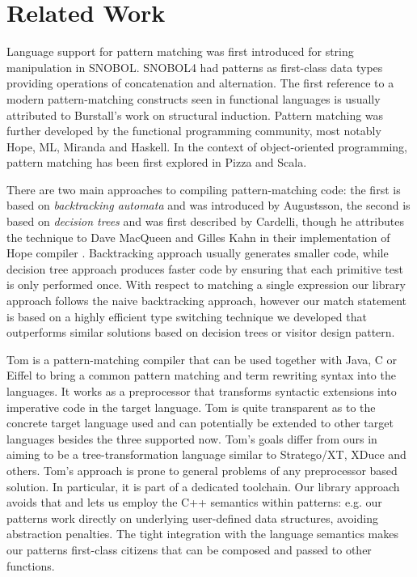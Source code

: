 \documentclass{llncs}
\begin{document}
\section{Related Work} %
\label{sec:rw}

Language support for pattern matching was first introduced for string 
manipulation in SNOBOL\cite{SNOBOL64}. SNOBOL4 had patterns as first-class data 
types providing operations of concatenation and alternation\cite{SNOBOL71}. The 
first reference to a modern pattern-matching constructs seen in functional 
languages is usually attributed to Burstall's work on structural 
induction\cite{Burstall69provingproperties}. Pattern matching was further 
developed by the functional programming community, most notably 
Hope\cite{BMS80}, ML\cite{ML90}, Miranda\cite{Miranda85} and 
Haskell\cite{Haskell98Book}. In the context of object-oriented programming, 
pattern matching has been first explored in Pizza\cite{Odersky97pizzainto} and 
Scala\cite{Scala2nd,EmirThesis}.

There are two main approaches to compiling pattern-matching code: the first is 
based on \emph{backtracking automata} and was introduced by Augustsson\cite{Augustsson85}, 
the second is based on \emph{decision trees} and was first described by 
Cardelli\cite{Cardelli84}, though he attributes the technique to Dave MacQueen 
and Gilles Kahn in their implementation of Hope compiler \cite{BMS80}.
Backtracking approach usually generates smaller code, while decision tree 
approach produces faster code by ensuring that each primitive test is only 
performed once. With respect to matching a single expression our library 
approach follows the naive backtracking approach, however our match statement is 
based on a highly efficient type switching technique we developed\cite{TypeSwitch} 
that outperforms similar solutions based on decision trees or visitor design pattern.

Tom is a pattern-matching compiler that can be used together with Java, C or 
Eiffel to bring a common pattern matching and term rewriting syntax into the 
languages\cite{Moreau:2003}. It works as a preprocessor that transforms 
syntactic extensions into imperative code in the target language. Tom is quite 
transparent as to the concrete target language used and can potentially be 
extended to other target languages besides the three supported now.
Tom's  goals differ from ours in aiming to be a
tree-transformation language similar to Stratego/XT, XDuce and others. 
Tom's approach is prone to general problems of any preprocessor based 
solution\cite[]{SELL}. In particular, it is part of a dedicated toolchain.
Our library approach avoids that and lets us employ the C++ semantics within 
patterns: e.g. our patterns work directly on underlying user-defined data 
structures, avoiding abstraction penalties. The tight integration with 
the language semantics makes our patterns first-class citizens that can be 
composed and passed to other functions. 
\end{document}
